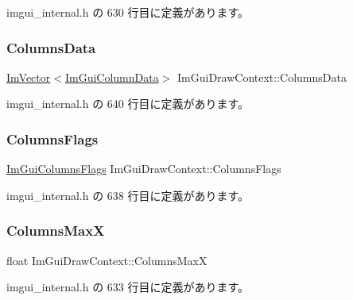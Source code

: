  imgui\+\_\+internal.\+h の 630 行目に定義があります。

\mbox{\label{struct_im_gui_draw_context_ae0f7e8f70065e8ddc45d62cf33195a0f}} 
\subsubsection{\texorpdfstring{Columns\+Data}{ColumnsData}}
{\footnotesize\ttfamily \mbox{\hyperlink{class_im_vector}{Im\+Vector}}$<$\mbox{\hyperlink{struct_im_gui_column_data}{Im\+Gui\+Column\+Data}}$>$ Im\+Gui\+Draw\+Context\+::\+Columns\+Data}



 imgui\+\_\+internal.\+h の 640 行目に定義があります。

\mbox{\label{struct_im_gui_draw_context_acd823cd056a5922a9f3a7c8844451ea7}} 
\subsubsection{\texorpdfstring{Columns\+Flags}{ColumnsFlags}}
{\footnotesize\ttfamily \mbox{\hyperlink{imgui_8h_a0edb3053546fcf6c5f7dcb7531c3a17a}{Im\+Gui\+Columns\+Flags}} Im\+Gui\+Draw\+Context\+::\+Columns\+Flags}



 imgui\+\_\+internal.\+h の 638 行目に定義があります。

\mbox{\label{struct_im_gui_draw_context_aa6b05d0a845896193dff628b02f71ba0}} 
\subsubsection{\texorpdfstring{Columns\+MaxX}{ColumnsMaxX}}
{\footnotesize\ttfamily float Im\+Gui\+Draw\+Context\+::\+Columns\+MaxX}



 imgui\+\_\+internal.\+h の 633 行目に定義があります。

